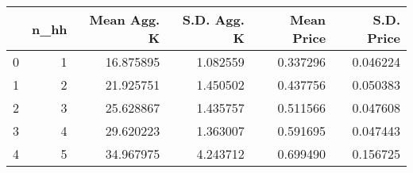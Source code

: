 \begin{tabular}{lrrrrr}
\toprule
{} &  n\_hh &  Mean Agg. K &  S.D. Agg. K &  Mean Price &  S.D. Price \\
\midrule
0 &     1 &    16.875895 &     1.082559 &    0.337296 &    0.046224 \\
1 &     2 &    21.925751 &     1.450502 &    0.437756 &    0.050383 \\
2 &     3 &    25.628867 &     1.435757 &    0.511566 &    0.047608 \\
3 &     4 &    29.620223 &     1.363007 &    0.591695 &    0.047443 \\
4 &     5 &    34.967975 &     4.243712 &    0.699490 &    0.156725 \\
\bottomrule
\end{tabular}
